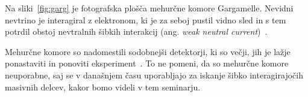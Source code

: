 Na sliki~\ref{fig:garg} je fotografska plošča mehurčne komore Gargamelle. Nevidni nevtrino je interagiral z elektronom, ki je za seboj pustil vidno sled in s tem potrdil obstoj nevtralnih šibkih interakcij (ang. \textit{weak neutral current})~\cite{noauthor_gargamelle_2026}.


Mehurčne komore so nadomestili sodobnejši detektorji, ki so večji, jih je lažje ponastaviti in ponoviti eksperiment~\cite{noauthor_bubble_2024}. To ne pomeni, da so mehurčne komore neuporabne, saj se v današnjem času uporabljajo za iskanje šibko interagirajočih masivnih delcev, kakor bomo videli v tem seminarju.






